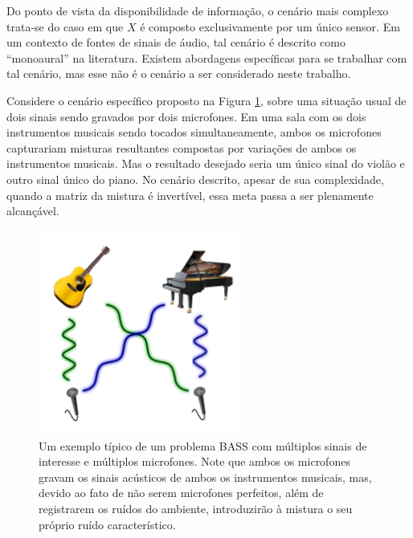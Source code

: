 
Do ponto de vista da disponibilidade de informação, o cenário mais complexo trata-se do caso em que $X$ é composto exclusivamente por um único sensor. Em um contexto de fontes de sinais de áudio, tal cenário é descrito como ``monoaural'' na literatura. Existem abordagens específicas para se trabalhar com tal cenário, mas esse não é o cenário a ser considerado neste trabalho.


Considere o cenário específico proposto na Figura \ref{fig:bass_example}, sobre uma situação usual de dois sinais sendo gravados por dois microfones. Em uma sala com os dois instrumentos musicais sendo tocados simultaneamente, ambos os microfones capturariam misturas resultantes compostas por variações de ambos os instrumentos musicais. Mas o resultado desejado seria um único sinal do violão e outro sinal único do piano. No cenário descrito, apesar de sua complexidade, quando a matriz da mistura é invertível, essa meta passa a ser plenamente alcançável.

\begin{figure}[H]
    \centering
    \includegraphics[width=0.60\textwidth]{figs/bass_example.pdf}
    \caption{Um exemplo típico de um problema BASS com múltiplos sinais de interesse e múltiplos microfones. Note que ambos os microfones gravam os sinais acústicos de ambos os instrumentos musicais, mas, devido ao fato de não serem microfones perfeitos, além de registrarem os ruídos do ambiente, introduzirão à mistura o seu próprio ruído característico.}
    \label{fig:bass_example}
\end{figure}

